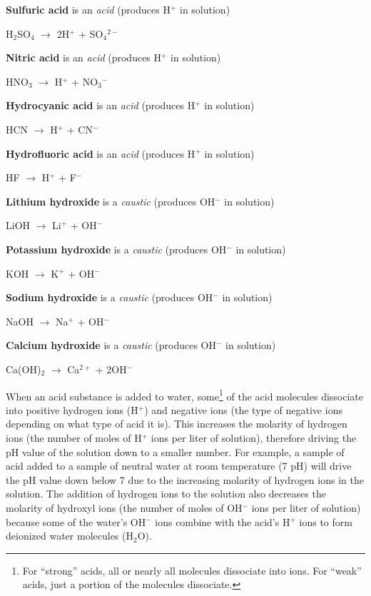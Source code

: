 \vskip 10pt

\noindent
\textbf{Sulfuric acid} is an \textit{acid} (produces H$^{+}$ in solution)

H$_{2}$SO$_{4}$ $\to$ 2H$^{+}$ + SO$_{4}$$^{2-}$

\vskip 10pt

\noindent
\textbf{Nitric acid} is an \textit{acid} (produces H$^{+}$ in solution)

HNO$_{3}$ $\to$ H$^{+}$ + NO$_{3}$$^{-}$

\vskip 10pt

\noindent
\textbf{Hydrocyanic acid} is an \textit{acid} (produces H$^{+}$ in solution)

HCN $\to$ H$^{+}$ + CN$^{-}$

\vskip 10pt

\noindent
\textbf{Hydrofluoric acid} is an \textit{acid} (produces H$^{+}$ in solution)

HF $\to$ H$^{+}$ + F$^{-}$

\vskip 10pt

\noindent
\textbf{Lithium hydroxide} is a \textit{caustic} (produces OH$^{-}$ in solution)

LiOH $\to$ Li$^{+}$ + OH$^{-}$

\vskip 10pt

\noindent
\textbf{Potassium hydroxide} is a \textit{caustic} (produces OH$^{-}$ in solution)

KOH $\to$ K$^{+}$ + OH$^{-}$

\vskip 10pt

\noindent
\textbf{Sodium hydroxide} is a \textit{caustic} (produces OH$^{-}$ in solution)

NaOH $\to$ Na$^{+}$ + OH$^{-}$

\vskip 10pt

\noindent
\textbf{Calcium hydroxide} is a \textit{caustic} (produces OH$^{-}$ in solution)

Ca(OH)$_{2}$ $\to$ Ca$^{2+}$ + 2OH$^{-}$

\vskip 10pt

When an acid substance is added to water, some\footnote{For ``strong'' acids, all or nearly all molecules dissociate into ions.  For ``weak'' acids, just a portion of the molecules dissociate.} of the acid molecules dissociate into positive hydrogen ions (H$^{+}$) and negative ions (the type of negative ions depending on what type of acid it is).  This increases the molarity of hydrogen ions (the number of moles of H$^{+}$ ions per liter of solution), therefore driving the pH value of the solution down to a smaller number.  For example, a sample of acid added to a sample of neutral water at room temperature (7 pH) will drive the pH value down below 7 due to the increasing molarity of hydrogen ions in the solution.  The addition of hydrogen ions to the solution also decreases the molarity of hydroxyl ions (the number of moles of OH$^{-}$ ions per liter of solution) because some of the water's OH$^{-}$ ions combine with the acid's H$^{+}$ ions to form deionized water molecules (H$_{2}$O).        

